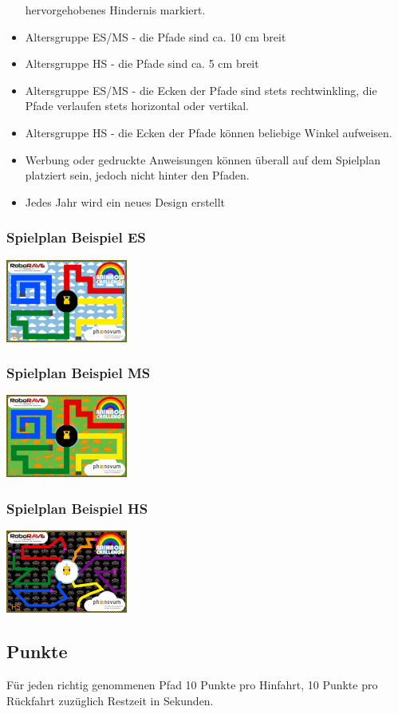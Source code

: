 \documentclass[a4paper,12pt]{article}
\begin{document}
\begin{itemize}
		hervorgehobenes Hindernis markiert.
	\item Altersgruppe ES/MS - die Pfade sind ca. 10 cm breit
	\item Altersgruppe HS - die Pfade sind ca. 5 cm breit
	\item Altersgruppe ES/MS - die Ecken der Pfade sind stets
		rechtwinkling, die Pfade verlaufen stets horizontal oder
		vertikal.
	\item Altersgruppe HS - die Ecken der Pfade können beliebige Winkel
		aufweisen.
	\item Werbung oder gedruckte Anweisungen können überall auf dem
		Spielplan platziert sein, jedoch nicht hinter den Pfaden.
	\item Jedes Jahr wird ein neues Design erstellt
\end{itemize}

\subsubsection{Spielplan Beispiel ES}
\includegraphics[width=0.3\textwidth]{images/cyberspace/rainbow_es.png}

\subsubsection{Spielplan Beispiel MS}
\includegraphics[width=0.3\textwidth]{images/cyberspace/rainbow_ms.png}

\subsubsection{Spielplan Beispiel HS}
\includegraphics[width=0.3\textwidth]{images/cyberspace/rainbow_hs.png}

\subsection{Punkte}

Für jeden richtig genommenen Pfad 10 Punkte pro Hinfahrt, 10 Punkte pro
Rückfahrt zuzüglich Restzeit in Sekunden.
\end{document}
